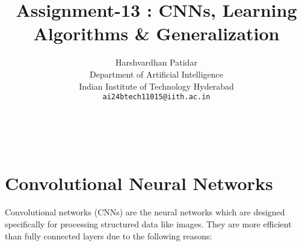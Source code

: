 \documentclass{article}
\title{Assignment-13 : CNNs, Learning Algorithms \& Generalization}
\author{Harshvardhan Patidar\\
  Department of Artificial Intelligence\\
  Indian Institute of Technology Hyderabad\\
  \texttt{ai24btech11015@iith.ac.in}
}
\begin{document}
\



\maketitle


\section{Convolutional Neural Networks}
  \paragraph{} Convolutional networks (CNNs) are the neural networks which are designed specifically for processing structured data like images. They are more efficient than fully connected layers due to the following reasons: 
   
\end{document}
